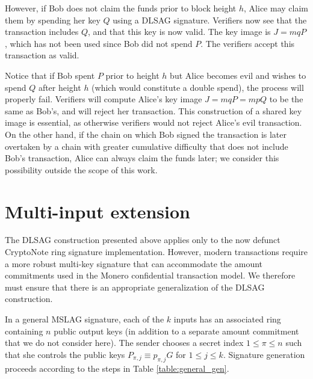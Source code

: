 \documentclass{mrl}
\begin{document}
However, if Bob does not claim the funds prior to block height $h$, Alice may claim them by spending her key $Q$ using a DLSAG signature. Verifiers now see that the transaction includes $Q$, and that this key is now valid. The key image is $J = mqP$, which has not been used since Bob did not spend $P$. The verifiers accept this transaction as valid.

Notice that if Bob spent $P$ prior to height $h$ but Alice becomes evil and wishes to spend $Q$ after height $h$ (which would constitute a double spend), the process will properly fail. Verifiers will compute Alice's key image $J = mqP = mpQ$ to be the same as Bob's, and will reject her transaction. This construction of a shared key image is essential, as otherwise verifiers would not reject Alice's evil transaction. On the other hand, if the chain on which Bob signed the transaction is later overtaken by a chain with greater cumulative difficulty that does not include Bob's transaction, Alice can always claim the funds later; we consider this possibility outside the scope of this work.

\section{Multi-input extension}
The DLSAG construction presented above applies only to the now defunct CryptoNote ring signature implementation. However, modern transactions require a more robust multi-key signature that can accommodate the amount commitments used in the Monero confidential transaction model. We therefore must ensure that there is an appropriate generalization of the DLSAG construction.

In a general MSLAG signature, each of the $k$ inputs has an associated ring containing $n$ public output keys (in addition to a separate amount commitment that we do not consider here). The sender chooses a secret index $1 \leq \pi \leq n$ such that she controls the public keys $P_{\pi,j} \equiv p_{\pi,j}G$ for $1 \leq j \leq k$. Signature generation proceeds according to the steps in Table \ref{table:general_gen}.
\end{document}
